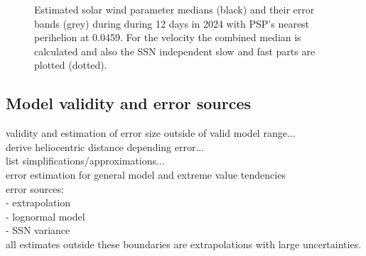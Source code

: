 \begin{figure}
	\caption{Estimated solar wind parameter medians (black) and their error bands (grey) during during 12 days in 2024 with PSP's nearest perihelion at \SI{0.0459}{\au}. For the velocity the combined median is calculated and also the SSN independent slow and fast parts are plotted (dotted).}
	\label{fig:SPP_perihelia_prediction_nearest_e_plot}
\end{figure}

\subsection{Model validity and error sources}
\label{sec:model_validity_and_errors}

validity and estimation of error size outside of valid model range...\\
derive heliocentric distance depending error...\\

list simplifications/approximations...\\

error estimation for general model and extreme value tendencies\\

error sources:\\
- extrapolation\\
- lognormal model\\
- SSN variance\\

all estimates outside these boundaries are extrapolations with large uncertainties.\\

